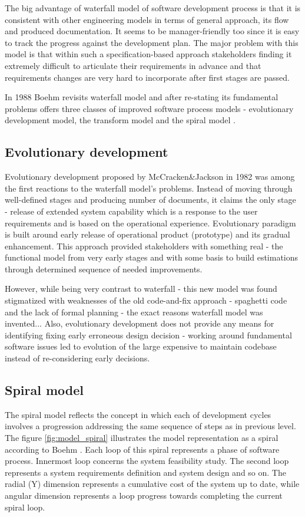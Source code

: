 The big advantage of waterfall model of software development process is that 
it is consistent with other engineering models in terms of general approach, 
its flow and produced documentation. It seems to be manager-friendly too since
it is easy to track the progress against the development plan. The major 
problem with this model is
that within such a specification-based approach stakeholders finding it 
extremely difficult to articulate their requirements in advance and 
that requirements changes are very hard to incorporate after first stages are passed.

In 1988 Boehm revisits waterfall model and after re-stating its fundamental problems 
offers three classes of improved software process models - evolutionary development 
model, the transform model and the spiral model \cite{citeulike:10002126}.

\subsection{Evolutionary development}
Evolutionary development proposed by McCracken\&Jackson in 1982 \cite{citeulike:3996892}
was among the first reactions to the waterfall model's problems. Instead of moving 
through well-defined stages and producing number of documents, it claims the only
stage - release of extended system capability which is a response to the user 
requirements and is based on the operational experience. Evolutionary paradigm 
is built around early release of operational product (prototype) and its gradual 
enhancement. This approach provided stakeholders with something real - the functional 
model from very early stages and with some basis to build estimations through 
determined sequence of needed improvements.

However, while being very contrast to waterfall - this new model was found stigmatized 
with weaknesses of the old code-and-fix approach - spaghetti code and the lack of 
formal planning - the exact reasons waterfall model was invented... Also, 
evolutionary development does not provide any means for identifying fixing early 
erroneous design decision - working around fundamental software issues led to 
evolution of the large expensive to maintain codebase instead of re-considering 
early decisions.


\subsection{Spiral model}
The spiral model reflects the concept in which each of development cycles involves a 
progression addressing the same sequence of steps as in previous level. The figure 
\ref{fig:model_spiral} illustrates the model representation as a spiral according 
to Boehm \cite{citeulike:10002126}. Each loop of this spiral represents a phase of 
software process. Innermost loop concerns the system feasibility study. The second 
loop represents a system requirements definition and system design and so on. 
The radial (Y) dimension represents a cumulative cost of the system up to date, 
while angular dimension represents a loop progress towards completing the current 
spiral loop.

